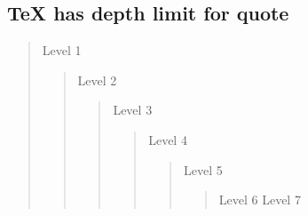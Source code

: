 
\subsection*{TeX has depth limit for quote}

	\begin{quotation}
Level 1
		\begin{quotation}
Level 2
			\begin{quotation}
Level 3
				\begin{quotation}
Level 4
					\begin{quotation}
Level 5
						\begin{quotation}
Level 6
Level 7
						\end{quotation}
					\end{quotation}
				\end{quotation}
			\end{quotation}
		\end{quotation}
	\end{quotation}
